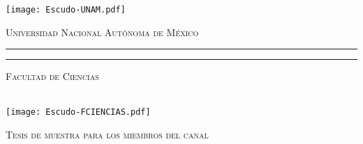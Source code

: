 \documentclass[letter,twoside,12pt]{book}
\begin{document}
\frontmatter
\begin{titlepage}
        \thispagestyle{empty}
        \begin{minipage}[c][0.17\textheight][c]{0.25\textwidth}
            \begin{center}
                \texttt{[image: Escudo-UNAM.pdf]}
            \end{center}
        \end{minipage}
        \begin{minipage}[c][0.195\textheight][t]{0.75\textwidth}
            \begin{center}
                \vspace{0.3cm}
                \textsc{\large Universidad Nacional Aut\'onoma de M\'exico}\\[0.5cm]
                \vspace{0.3cm}
                \hrule height2.5pt
                \vspace{.2cm}
                \hrule height1pt
                \vspace{.8cm}
                \textsc{Facultad de Ciencias}\\[0.5cm] %
            \end{center}
        \end{minipage}

        \begin{minipage}[c][0.81\textheight][t]{0.25\textwidth}
            \vspace*{5mm}
            \begin{center}
                \hskip2.0mm
                \vrule width1pt height13cm 
                \vspace{5mm}
                \hskip2pt
                \vrule width2.5pt height13cm
                \hskip2mm
                \vrule width1pt height13cm \\
                \vspace{5mm}
                \texttt{[image: Escudo-FCIENCIAS.pdf]}
            \end{center}
        \end{minipage}
        \begin{minipage}[c][0.81\textheight][t]{0.75\textwidth}
            \begin{center}
                \vspace{1cm}

                {\large\scshape Tesis de muestra para los miembros del canal}\\[.2in]


\end{center}
\end{minipage}
\end{titlepage}
\end{document}
